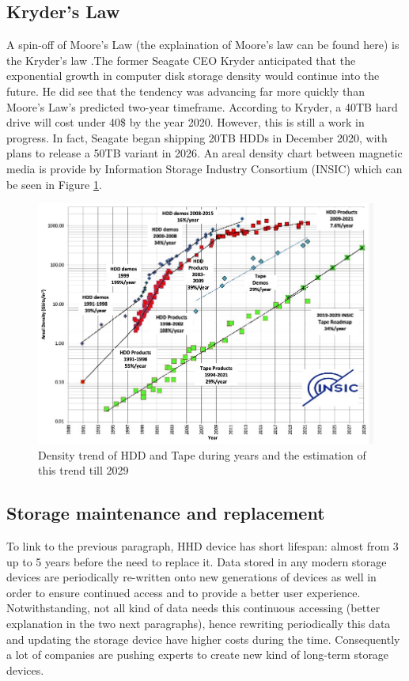 \documentclass[10pt,twocolumn,twoside]{gsajnl}
\theoremstyle{definition}
\begin{document}
\subsection{Kryder's Law}
A spin-off of Moore’s Law (the explaination of Moore's law can be found here) is the Kryder's law \cite{walter2005kryder}.The former Seagate CEO Kryder anticipated that the exponential growth in computer disk storage density would continue into the future. He did see that the tendency was advancing far more quickly than Moore's Law's predicted two-year timeframe. According to Kryder, a 40TB hard drive will cost under 40\$ by the year 2020.
However, this is still a work in progress. In fact, Seagate began shipping 20TB HDDs in December 2020, with plans to release a 50TB variant in 2026. An areal density chart between magnetic media is provide by Information Storage Industry Consortium (INSIC) \cite{INSIC} which can be seen in Figure \ref{fig1}.
\begin{figure}[ht]
    \includegraphics[width=\linewidth]{Figures/INSIC-2022-Areal-Density-Chart.jpeg}
    \caption{Density trend of HDD and Tape during years and the estimation of this trend till 2029}
    \centering
    \label{fig1}
\end{figure}
\subsection{Storage maintenance and replacement}
To link to the previous paragraph, HHD device has short lifespan: almost from 3 up to 5 years before the need to replace it. Data stored in any modern storage devices are periodically re-written onto new generations of devices as well in order to ensure continued access and to provide a better user experience.
Notwithstanding, not all kind of data needs this continuous accessing (better explanation in the two next paragraphs), hence rewriting periodically this data and updating the storage device have higher costs during the time. Consequently a lot of companies are pushing experts to create new kind of long-term storage devices.
\end{document}
